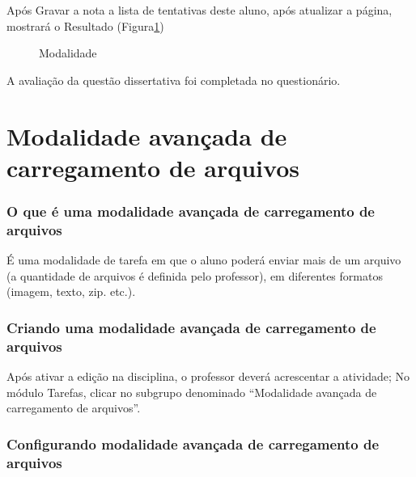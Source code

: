 Após Gravar a nota a lista de tentativas deste aluno, após atualizar a página, mostrará o Resultado (Figura\ref{fig:cap5_28})

\begin{figure}[htbp]
 \begin{center}
  \caption{Modalidade}
  \label{fig:cap5_28}
 \end{center}
\end{figure}

A avaliação da questão dissertativa foi completada no questionário.

\section{Modalidade avançada de carregamento de arquivos}


\subsubsection{O que é uma modalidade avançada de carregamento de arquivos}

É uma modalidade de tarefa em que o aluno poderá enviar mais de um arquivo (a quantidade de arquivos é definida pelo professor), em diferentes formatos (imagem, texto, zip. etc.).

\subsubsection{Criando uma modalidade avançada de carregamento de arquivos}

Após ativar a edição na disciplina, o professor deverá acrescentar a atividade; No módulo Tarefas, clicar no subgrupo denominado “Modalidade avançada de carregamento de arquivos”.

\subsubsection{Configurando modalidade avançada de carregamento de arquivos}


